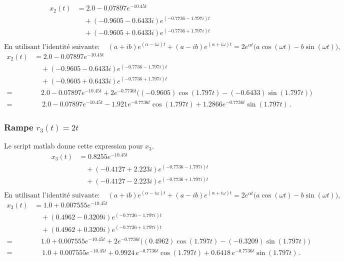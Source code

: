 \documentclass[12pt]{article}
\begin{document}
    \[
        \begin{aligned}
            x_2(t)
            &=2.0-0.07897e^{-10.45t}\\
            &\quad+(-0.9605-0.6433i)e^{(-0.7736-1.797i)t}\\
            &\quad+(-0.9605+0.6433i)e^{(-0.7736+1.797i)t}\\
        \end{aligned}
    \]
    \[
        \text{En utilisant l'identité suivante}:\quad
        (a+ib)e^{(\alpha-i\omega)t}+(a-ib)e^{(\alpha+i\omega)t}
        =2e^{\alpha t}\big(a\cos(\omega t)-b\sin(\omega t)\big),
    \]
    \[
        \begin{aligned}
            x_2(t)
            &=2.0-0.07897e^{-10.45t}\\
            &\quad+(-0.9605-0.6433i)e^{(-0.7736-1.797i)t}\\
            &\quad+(-0.9605+0.6433i)e^{(-0.7736+1.797i)t}\\
            =&\quad2.0-0.07897e^{-10.45t}+2e^{-0.7736t}\Big((-0.9605)\cos(1.797t)-(-0.6433)\sin(1.797t)\Big)\\
            =&\quad\boxed{\, 2.0 - 0.07897e^{-10.45t} - 1.921e^{-0.7736t}\cos(1.797t) + 1.2866e^{-0.7736t}\sin(1.797t) \,}.
        \end{aligned}
    \]


    \subsubsection*{Rampe $r_3(t)=2t$}
    Le script matlab donne cette expression pour $x_3$.
    \[
        \begin{aligned}
            x_3(t)
            &=0.8255e^{-10.45t}\\
            &\quad+(-0.4127+2.223i)e^{(-0.7736-1.797i)t}\\
            &\quad+(-0.4127-2.223i)e^{(-0.7736+1.797i)t}\\
        \end{aligned}
    \]
    \[
        \text{En utilisant l'identité suivante}:\quad
        (a+ib)e^{(\alpha-i\omega)t}+(a-ib)e^{(\alpha+i\omega)t}
        =2e^{\alpha t}\big(a\cos(\omega t)-b\sin(\omega t)\big),
    \]
    \[
        \begin{aligned}
            x_3(t)
            &=1.0+0.007555e^{-10.45t}\\
            &\quad+(0.4962-0.3209i)e^{(-0.7736-1.797i)t}\\
            &\quad+(0.4962+0.3209i)e^{(-0.7736+1.797i)t}\\
            =&\quad1.0+0.007555e^{-10.45t}+2e^{-0.7736t}\Big((0.4962)\cos(1.797t)-(-0.3209)\sin(1.797t)\Big)\\
            =&\quad\boxed{\,1.0+0.007555e^{-10.45t}+0.9924\,e^{-0.7736t}\cos(1.797t)+0.6418\,e^{-0.7736t}\sin(1.797t)\,}.
        \end{aligned}
    \]
\end{document}
